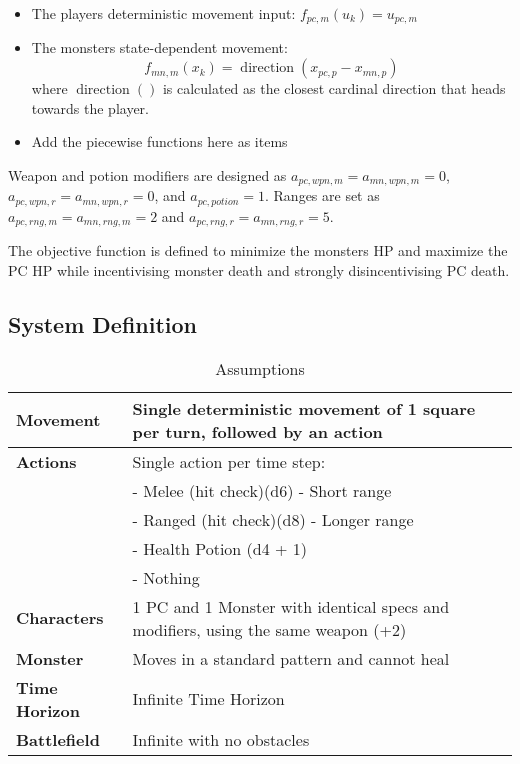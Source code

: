 \documentclass[letterpaper, 10 pt, conference]{ieeeconf}
\begin{document}
\begin{itemize}
    \item The players deterministic movement input: $f_{pc,m}(u_k) = u_{pc,m}$
    \item The monsters state-dependent movement:\[
        f_{mn,m}(x_k) = \operatorname{direction}(x_{pc,p} - x_{mn,p})
    \] where $\operatorname{direction}()$ is calculated as the closest cardinal direction that heads towards the player.
    \item {\color{red} Add the piecewise functions here as items} 

   
\end{itemize}
Weapon and potion modifiers are designed as $a_{pc,wpn,m} = a_{mn,wpn,m} = 0$, $a_{pc,wpn,r} = a_{mn,wpn,r} = 0$, and $a_{pc,potion} = 1$.
Ranges are set as $a_{pc,rng,m}= a_{mn,rng,m} = 2$ and $ a_{pc,rng,r} =  a_{mn,rng,r} = 5$.

The objective function is defined to minimize the monsters HP and maximize the PC HP while incentivising monster death and strongly disincentivising PC death.


\subsection{System Definition}

\begin{table}[h]
\centering
\caption{Assumptions}
\label{tab:assumptions}
\begin{tabular}{|l|p{6cm}|}
\hline
\textbf{Movement} & Single deterministic movement of 1 square per turn, followed by an action \\
\hline
\textbf{Actions} & Single action per time step: \\
& - Melee (hit check)(d6) - Short range \\
& - Ranged (hit check)(d8) - Longer range \\
& - Health Potion (d4 + 1) \\
& - Nothing \\
\hline
\textbf{Characters} & 1 PC and 1 Monster with identical specs and modifiers, using the same weapon (+2) \\
\hline
\textbf{Monster} & Moves in a standard pattern and cannot heal \\
\hline
\textbf{Time Horizon} & Infinite Time Horizon \\
\hline
\textbf{Battlefield} & Infinite with no obstacles \\
\hline
\end{tabular}
\end{table}
\end{document}
